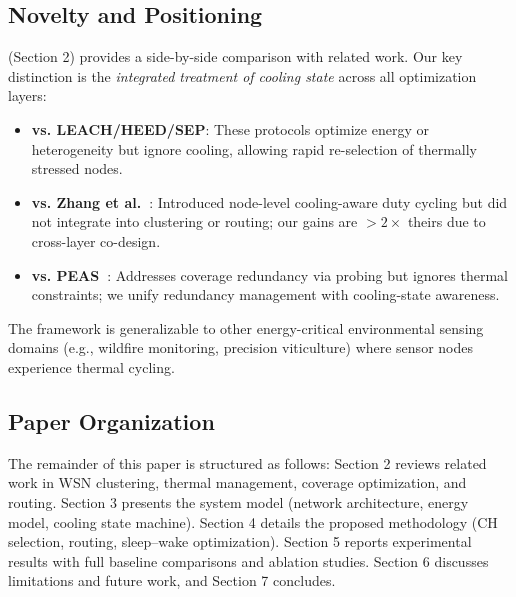 \subsection{Novelty and Positioning}

 (Section 2) provides a side-by-side comparison with related work. Our key distinction is the \emph{integrated treatment of cooling state} across all optimization layers:
\begin{itemize}[noitemsep]
  \item \textbf{vs. LEACH/HEED/SEP}: These protocols optimize energy or heterogeneity but ignore cooling, allowing rapid re-selection of thermally stressed nodes.
  \item \textbf{vs. Zhang et al.~\cite{zhang_cooling2021}}: Introduced node-level cooling-aware duty cycling but did not integrate into clustering or routing; our gains are $>2\times$ theirs due to cross-layer co-design.
  \item \textbf{vs. PEAS~\cite{ye2003peas}}: Addresses coverage redundancy via probing but ignores thermal constraints; we unify redundancy management with cooling-state awareness.
\end{itemize}

The framework is generalizable to other energy-critical environmental sensing domains (e.g., wildfire monitoring, precision viticulture) where sensor nodes experience thermal cycling.

\subsection{Paper Organization}

The remainder of this paper is structured as follows: Section 2 reviews related work in WSN clustering, thermal management, coverage optimization, and routing. Section 3 presents the system model (network architecture, energy model, cooling state machine). Section 4 details the proposed methodology (CH selection, routing, sleep--wake optimization). Section 5 reports experimental results with full baseline comparisons and ablation studies. Section 6 discusses limitations and future work, and Section 7 concludes.
